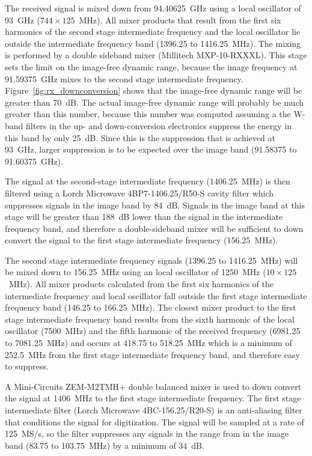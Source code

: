 \documentclass[12pt,letterpaper]{article}
\begin{document}
The received signal is mixed down from 94.40625~GHz using a local
oscillator of 93~GHz ($744\times125$~MHz). All mixer products that
result from the first six harmonics of the second stage intermediate
frequency and the local oscillator lie outside the intermediate
frequency band (1396.25 to 1416.25~MHz). The mixing is performed by a
double sideband mixer (Millitech MXP-10-RXXXL). This stage sets the
limit on the image-free dynamic range, because the image frequency at
91.59375~GHz mixes to the second stage intermediate
frequency. Figure~\ref{fig:rx_downconversion} shows that the
image-free dynamic range will be greater than 70~dB. The actual
image-free dynamic range will probably be much greater than this
number, because this number was computed assuming a the W-band filters
in the up- and down-conversion electronics suppress the energy in this
band by only 25~dB. Since this is the suppression that is achieved at
93~GHz, larger suppression is to be expected over the image band
(91.58375 to 91.60375~GHz).

The signal at the second-stage intermediate frequency (1406.25~MHz) is
then filtered using a Lorch Microwave 4BP7-1406.25/R50-S cavity filter
which suppresses signals in the image band by 84~dB. Signals in the
image band at this stage will be greater than 188~dB lower than the
signal in the intermediate frequency band, and therefore a
double-sideband mixer will be sufficient to down convert the signal to
the first stage intermediate frequency (156.25~MHz).

The second stage intermediate frequency signals (1396.25 to
1416.25~MHz) will be mixed down to 156.25~MHz using an local
oscillator of 1250~MHz ($10\times125$~MHz). All mixer products
calculated from the first six harmonics of the intermediate frequency
and local oscillator fall outside the first stage intermediate
frequency band (146.25 to 166.25~MHz). The closest mixer product to
the first stage intermediate frequency band results from the sixth
harmonic of the local oscillator (7500~MHz) and the fifth harmonic of
the received frequency (6981.25 to 7081.25~MHz) and occurs at 418.75
to 518.25~MHz which is a minimum of 252.5~MHz from the first stage
intermediate frequency band, and therefore easy to suppress.

A Mini-Circuits ZEM-M2TMH+ double balanced mixer is used to down
convert the signal at 1406~MHz to the first stage intermediate
frequency. The first stage intermediate filter (Lorch Microwave
4BC-156.25/R20-S) is an anti-aliasing filter that conditions the
signal for digitization. The signal will be sampled at a rate of
125~MS/s, so the filter suppresses any signals in the range from in
the image band (83.75 to 103.75~MHz) by a minimum of 34~dB.
\end{document}
